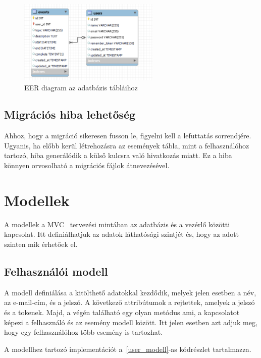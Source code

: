 \documentclass[
]{thesis-ekf}
\theoremstyle{definition}
\theoremstyle{remark}
\begin{document}
	\begin{figure}[ht!]
		\centering
		\includegraphics[width=0.6\textwidth]{database/EER_diagram}
		\caption{EER diagram az adatbázis tábláihoz}
		\label{figure:eer_diagram}
	\end{figure}
	
	\subsection{Migrációs hiba lehetőség}
	Ahhoz, hogy a migráció sikeresen fusson le, figyelni kell a lefuttatás sorrendjére. Ugyanis, ha előbb kerül létrehozásra az események tábla, mint a felhasználóhoz tartozó, hiba generálódik a külső kulcsra való hivatkozás miatt. Ez a hiba könnyen orvosolható a migrációs fájlok átnevezésével.
	
	\section{Modellek}
	A modellek a MVC~\cite{mvc_mozzilla} tervezési mintában az adatbázis és a vezérlő közötti kapcsolat. Itt definiálhatjuk az adatok láthatósági szintjét és, hogy az adott szinten mik érhetőek el.
	
	\subsection{Felhasználói modell}
	A modell definiálása a kitölthető adatokkal kezdődik, melyek jelen esetben a név, az e-mail-cím, és a jelszó. A következő attribútumok a rejtettek, amelyek a jelszó és a tokenek. Majd, a végén található egy olyan metódus ami, a kapcsolatot képezi a felhasználó és az esemény modell között. Itt jelen esetben azt adjuk meg, hogy egy felhasználóhoz több esemény is tartozhat.
	
	A modellhez tartozó implementációt a~\ref{user_modell}-as kódrészlet tartalmazza.
	
	
	
\end{document}
